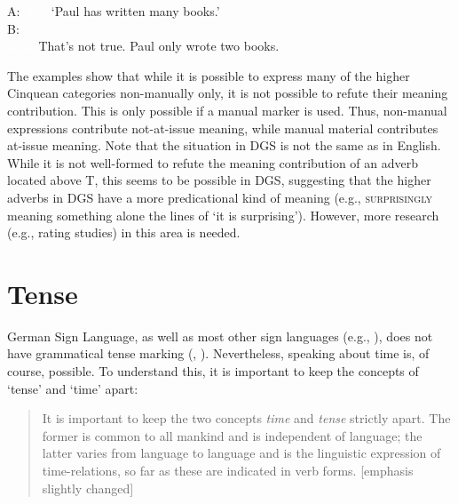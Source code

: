 \begin{exe}
\label{bsp:evaluationmuchlittlebnotatissuea}


\ex A:  
\glt \textcolor{white}{A: \#}`Paul has written many books.' \\
B:  \\
\textcolor{white}{A: \#} That's not true. Paul only wrote two books.

\label{bsp:evaluationmuchlittlebnotatissueb}

\end{exe}

\noindent The examples show that while it is possible to express many of the higher Cinquean categories non-manually only, it is not possible to refute their meaning contribution. This is only possible if a manual marker is used. Thus, non-manual expressions contribute not-at-issue meaning, while manual material contributes at-issue meaning. Note that the situation in DGS is not the same as in English. While it is not well-formed to refute the meaning contribution of an adverb located above T, this seems to be possible in DGS, suggesting that the higher adverbs in DGS have a more predicational kind of meaning (e.g., \textsc{surprisingly} meaning something alone the lines of `it is surprising'). However, more research (e.g., rating studies) in this area is needed.

\section{Tense}\label{tense}
German Sign Language, as well as most other sign languages (e.g., \citealt{cogen1977three, sandler2006sign}), does not have grammatical tense marking (\citealt{metzger2009zeitlinien}, \citealt[118]{happ2014vork}). Nevertheless, speaking about time is, of course, possible. To understand this, it is important to keep the concepts of `tense' and `time' apart:

\begin{quote}
It is important to keep the two concepts \textit{time} and \textit{tense} strictly apart. The former is common to all mankind and is independent of language; the latter varies from language to language and is the linguistic expression of time-relations, so far as these are indicated in verb forms. \citep[230]{jespersen1933essentials} [emphasis slightly changed]
\end{quote}

